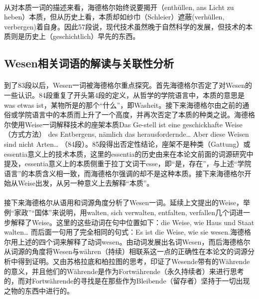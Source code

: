 \documentclass{article}
\begin{document}
		\paragraph{}
		从对本质一词的描述来看，海德格尔始终说要揭开（enthüllen, ans Licht zu heben）本质，但从历史上看，本质却如纱巾（Schleier）遮蔽(verhüllen, verbergen)着自身。因此57段说，现代技术虽然晚于自然科学的发展，但技术的本质则是历史上（geschichtlich）早先的东西。
		\paragraph{}
		
	\subsection{Wesen相关词语的解读与关联性分析}
		\paragraph{}
		到了83段以后，Wesen一词被海德格尔重点探究。首先海德格尔否定了对Wesen的一些认识。84段重复了开头第4段的定义，从哲学的学院语言中，本质的意思是was etwas ist，某物所是的那个“什么”，即Washeit。接下来海德格尔由之前的通俗或学院语言中的本质而上升了一个高度，并再次否定了本质的种类之说。海德格尔使用Weise一词解释技术的座架本质Das Ge-stell ist eine geschickhafte Weise（方式方法） des Entbergens, nämlich das herausfordernde… Aber diese Weisen sind nicht Arten… （84段）。85段得出否定性结论，座架不是种类（Gattung）或essentia意义上的技术本质，这里的essentia的历史由来在本论文前面的词源研究中提及，essentia意义上的本质侧重于拉丁文词干esse，即“是，存在”，与上述“学院语言”的本质含义相一致，而海德格尔强调的却不是这种本质。接下来海德格尔开始从Weise出发，从另一种意义上去解释“本质”。
		\paragraph{}
		接下来海德格尔从语用和词源角度分析了Wesen一词。延续上文提出的Weise，举例“家政”“国体”来说明，用walten, sich verwalten, entfalten, verfallen几个词进一步解释了Weise。这里的这些动词在句中位置如下：die Weise, wie Haus und Staat walten… 而后面一句用了完全相同的句式：Es ist die Weise, wie sie wesen.海德格尔用上述的四个词来解释了动词wesen。由动词发展出名词Wesen，而后海德格尔从词源的角度将Wesen与währen（持续）相联系这一点的正确性在本论文的词源分析中得到证明。又由苏格拉底和柏拉图的思考，印证了Wesende带有的Währende的意义，并且他们的Währende是作为Fortwährende（永久持续者）来进行思考的，而对Fortwährende的寻找是在那些作为Bleibende（留存者）坚持于一切出现之物的东西中进行的。
\end{document}

